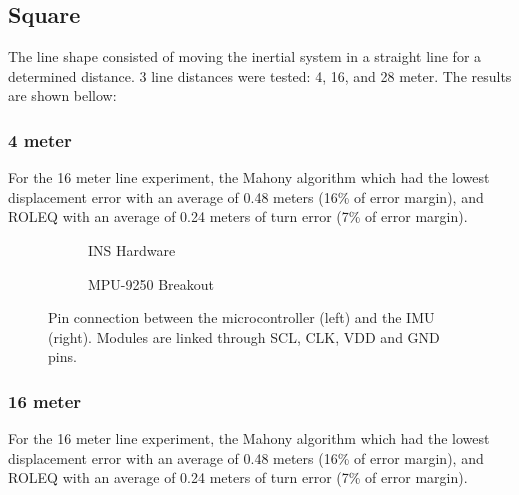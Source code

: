 \subsection{Square}

The line shape consisted of moving the inertial system in a straight line for a determined distance. 3 line distances were tested: 4, 16, and 28 meter. The results are shown bellow:

\subsubsection{4 meter}

For the 16 meter line experiment, the Mahony algorithm which had the lowest displacement error with an average of 0.48 meters (16\% of error margin), and ROLEQ with an average of 0.24 meters of turn error (7\% of error margin).


\begin{figure}[!h]
    \centering
    
\end{figure}

\begin{figure}[!h]
    \centering
    \begin{subfigure}{0.49\textwidth}
        \centering
        \resizebox{1\linewidth}{!}{}
        \caption{INS Hardware}
        \label{fig:sub1}
    \end{subfigure}
    \begin{subfigure}{0.49\textwidth}
        \centering
        \resizebox{1\linewidth}{!}{}
        \caption{MPU-9250 Breakout}
        \label{fig:sub2}
    \end{subfigure}
    \caption{Pin connection between the microcontroller (left) and the IMU (right). Modules are linked through SCL, CLK, VDD and GND pins.}
    \label{fig:square4}
\end{figure}

\subsubsection{16 meter}

For the 16 meter line experiment, the Mahony algorithm which had the lowest displacement error with an average of 0.48 meters (16\% of error margin), and ROLEQ with an average of 0.24 meters of turn error (7\% of error margin).

\begin{figure}[!h]
    \centering
    
\end{figure}

